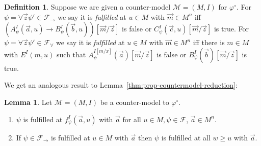 \documentclass[a4paper,11pt]{report}
\theoremstyle{definition}
\theoremstyle{definition}
\theoremstyle{definition}
\newtheorem{lemma}[theorem]{Lemma}
\theoremstyle{definition}
\theoremstyle{definition}
\newtheorem{definition}[theorem]{Definition}
\theoremstyle{definition}
\theoremstyle{definition}
\begin{document}
	
	\begin{definition}
		\label{def:fo-fulfilled}
		Suppose we are given a counter-model $\mathcal M = (M, I)$ for $\varphi^\circ$. For $\psi = \forall\vec z\psi'\in\mathcal F_\to$ we say it is \emph{fulfilled} at $u\in M$ with $\vec m\in M^n$ iff $(A_\psi^I(\vec a, u)\to B_\psi^I(\vec b, u))[\vec m/\vec z]$ is false or $C_\psi^I(\vec c, u)[\vec m/\vec z]$ is true.
		For $\psi = \forall\vec z\psi'\in\mathcal F_\forall$ we say it is \emph{fulfilled} at $u\in M$ with $\vec m\in M^n$ iff there is $m\in M$ with $E^{I}(m, u)$ such that $A^{I[m/x]}_\psi(\vec a)[\vec m/\vec z]$ is false or $B_\psi^I(\vec b)[\vec m/\vec z]$ is true.
	\end{definition}
	
	We get an analogous result to Lemma~\ref{thm:prop-countermodel-reduction}:
	
	\begin{lemma}
		\label{thm:fo-countermodel-reduction}
		Let $\mathcal M = (M, I)$ be a counter-model to $\mathcal \varphi^\circ$.
		\begin{enumerate}
			\item $\psi$ is fulfilled at $f_\psi^I(\vec a, u)$ with $\vec a$ for all $u\in M, \psi\in\mathcal F$, $\vec a\in M^n$.
			\item If $\psi\in\mathcal F_\to$ is fulfilled at $u\in M$ with $\vec a$ then $\psi$ is fulfilled at all $w\geq u$ with $\vec a$.
		\end{enumerate}	
	\end{lemma}
\end{document}
